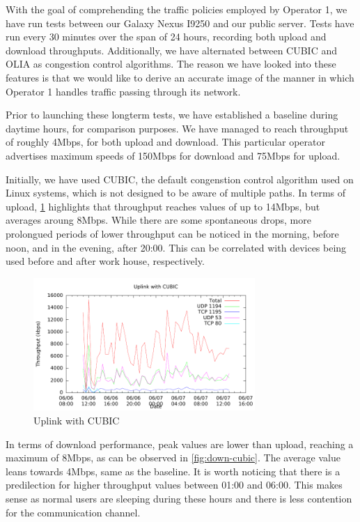 With the goal of comprehending the traffic policies employed by Operator 1, we
have run tests between our Galaxy Nexus I9250 and our public server. Tests
have run every 30 minutes over the span of 24 hours, recording both upload and
download throughputs. Additionally, we have alternated between CUBIC and OLIA
as congestion control algorithms. The reason we have looked into these
features is that we would like to derive an accurate image of the manner in
which Operator 1 handles traffic passing through its network.

Prior to launching these longterm tests, we have established a baseline during
daytime hours, for comparison purposes. We have managed to reach throughput of
roughly 4Mbps, for both upload and download. This particular operator
advertises maximum speeds of 150Mbps for download and 75Mbps for upload.

Initially, we have used CUBIC, the default congenstion control algorithm used
on Linux systems, which is not designed to be aware of multiple paths. In
terms of upload, \ref{fig:up-cubic} highlights that throughput reaches values
of up to 14Mbps, but averages aroung 8Mbps. While there are some spontaneous
drops, more prolongued periods of lower throughput can be noticed in the
morning, before noon, and in the evening, after 20:00. This can be correlated
with devices being used before and after work house, respectively.

\begin{figure}[H]
  \centering
  \includegraphics[width=0.75\textwidth]{img/up-cubic}
  \caption{Uplink with CUBIC}
  \label{fig:up-cubic}
\end{figure}

In terms of download performance, peak values are lower than upload, reaching
a maximum of 8Mbps, as can be observed in \ref{fig:down-cubic}. The average
value leans towards 4Mbps, same as the baseline. It is worth noticing that there
is a predilection for higher throughput values between 01:00 and 06:00. This
makes sense as normal users are sleeping during these hours and there is less
contention for the communication channel.

